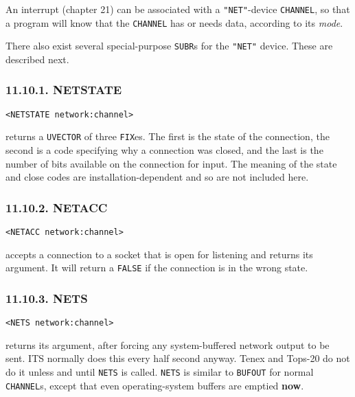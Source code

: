 \documentclass[a4paper,]{article}
\begin{document}
An interrupt (chapter 21) can be associated with a \texttt{"NET"}-device \texttt{CHANNEL}, so that a program will know that
the \texttt{CHANNEL} has or needs data, according to its \emph{mode}.

There also exist several special-purpose \texttt{SUBR}s for the \texttt{"NET"} device. These are described next.

\subsubsection{11.10.1. NETSTATE}\label{netstate}

\begin{verbatim}
<NETSTATE network:channel>
\end{verbatim}

 returns a \texttt{UVECTOR} of three \texttt{FIX}es. The first is the state of the
connection, the second is a code specifying why a connection was closed, and the last is the number of bits available on
the connection for input. The meaning of the state and close codes are installation-dependent and so are not included here.

\subsubsection{11.10.2. NETACC}\label{netacc}

\begin{verbatim}
<NETACC network:channel>
\end{verbatim}

 accepts a connection to a socket that is open for listening and returns its argument. It
will return a \texttt{FALSE} if the connection is in the wrong state.

\subsubsection{11.10.3. NETS}\label{nets}

\begin{verbatim}
<NETS network:channel>
\end{verbatim}

 returns its argument, after forcing any system-buffered network output to be sent. ITS
 normally does this every half second anyway. Tenex  and Tops-20
 do not do it unless and until \texttt{NETS} is called. \texttt{NETS} is similar to \texttt{BUFOUT}
 for normal \texttt{CHANNEL}s, except that even operating-system buffers are emptied \textbf{now}.
\end{document}
